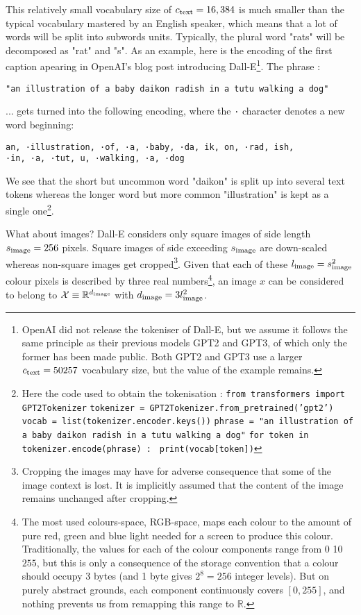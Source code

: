 \documentclass{article}
\begin{document}
\begin{appendix}
This relatively small vocabulary size of ${c_{\mathrm{text}}}=16,384$ is much smaller than the typical vocabulary mastered by an English speaker, which means that a lot of words will be split into subwords units. Typically, the plural word "rats" will be decomposed as "rat" and "s". As an example, here is the encoding of the first caption apearing in OpenAI's blog post introducing Dall-E\footnote{OpenAI did not release the tokeniser of Dall-E, but we assume it follows the same principle as their previous models GPT2 and GPT3, of which only the former has been made public. Both GPT2 and GPT3 use a larger ${c_{\mathrm{text}}}=50257$ vocabulary size, but the value of the example remains.}. The phrase :
\begin{verbatim}
"an illustration of a baby daikon radish in a tutu walking a dog"
\end{verbatim}
... gets turned into the following encoding, where the \verb+·+ character denotes a new word beginning:
\begin{verbatim}
an, ·illustration, ·of, ·a, ·baby, ·da, ik, on, ·rad, ish,
·in, ·a, ·tut, u, ·walking, ·a, ·dog
\end{verbatim}

We see that the short but uncommon word "daikon" is split up into several text tokens whereas the longer word but more common "illustration" is kept as a single one\footnote{Here the code used to obtain the tokenisation :
\newline \texttt{from transformers import GPT2Tokenizer}
\newline \texttt{tokenizer = GPT2Tokenizer.from_pretrained('gpt2')}
\newline \texttt{vocab     = list(tokenizer.encoder.keys())}
\newline \texttt{phrase    = "an illustration of a baby daikon radish in a tutu walking a dog"}
\newline \texttt{for token in tokenizer.encode(phrase) :}
\newline \texttt{    print(vocab[token])}
}. 

What about images?
Dall-E considers only square images of side length $s_{\mathrm{image}}=256$ pixels.
Square images of side exceeding $s_{\mathrm{image}}$ are down-scaled whereas non-square images get cropped\footnote{
Cropping the images may have for adverse consequence that some of the image context is lost. It is implicitly assumed that the content of the image remains unchanged after cropping.
}.
Given that each of these $l_{\mathrm{image}}=s_{\mathrm{image}}^2$ colour pixels is described by three real numbers\footnote{
The most used colours-space, RGB-space, maps each colour to the amount of pure red, green and blue light needed for a screen to produce this colour. Traditionally, the values for each of the colour components range from 0 10 $255$, but this is only a consequence of the storage convention that a colour should occupy 3 bytes (and 1 byte gives $2^8=256$ integer levels). But on purely abstract grounds, each component continuously covers $[0,255]$, and nothing prevents us from remapping this range to $\mathbb{R}$.
}, an image $x$ can be considered to belong to $\mathcal{X}\equiv \mathbb{R}^{d_{\mathrm{image}}}$ with $d_{\mathrm{image}}=3l_{\mathrm{image}}^2$.


\end{appendix}
\end{document}
